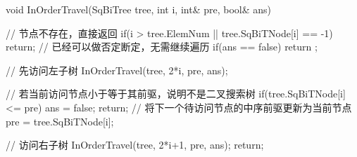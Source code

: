 \begin{exerciseanswer}
\begin{cppcode}
    void InOrderTravel(SqBiTree tree, int i, int& pre, bool& ans) {
        // 节点不存在，直接返回
        if(i > tree.ElemNum || tree.SqBiTNode[i] == -1) return;
        // 已经可以做否定断定，无需继续遍历
        if(ans == false) return ;

        // 先访问左子树
        InOrderTravel(tree, 2*i, pre, ans);

        // 若当前访问节点小于等于其前驱，说明不是二叉搜索树
        if(tree.SqBiTNode[i] <= pre) {
            ans = false;
            return;
        }
        // 将下一个待访问节点的中序前驱更新为当前节点
        pre = tree.SqBiTNode[i];

        // 访问右子树
        InOrderTravel(tree, 2*i+1, pre, ans);
        return;
    }
\end{cppcode}




\end{exerciseanswer}%


